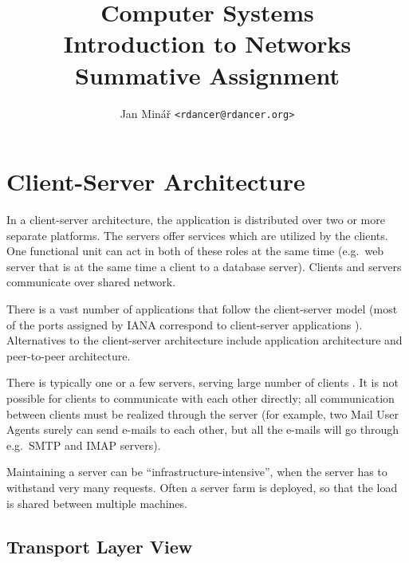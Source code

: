 \documentclass[10pt]{report}
\author{Jan Minář {\tt <rdancer@rdancer.org>}}
\title{Computer Systems\\Introduction to Networks\\Summative Assignment}
\begin{document}


\maketitle




\chapter{Client-Server Architecture}
\thispagestyle{fancy}

In a client-server architecture, the application is distributed over two or
more separate platforms.  The servers offer services which are utilized by the
clients.  One functional unit can act in both of these roles at the same time
(e.g.\ web server that is at the same time a client to a database server).
Clients and servers communicate over shared network. \cite[pp3--11]{vaughn}

There is a vast number of applications that follow the client-server model
(most of the ports assigned by IANA correspond to client-server applications
\cite{iana}).  Alternatives to the client-server architecture include
application architecture and peer-to-peer architecture.  \cite[p110]{kurose}

There is typically one or a few servers, serving large number of clients
\cite[p110]{kurose}.  It is not possible for clients to communicate
with each other directly; all communication between clients must be
realized through the server (for example, two Mail User Agents surely
can send e-mails to each other, but all the e-mails will go through
e.g.\ SMTP and IMAP servers).

Maintaining a server can be ``infrastructure-intensive'', when the server has
to withstand very many requests.  Often a server farm is deployed, so that the
load is shared between multiple machines.  \cite[p110]{kurose}

\section{Transport Layer View}
\end{document}
